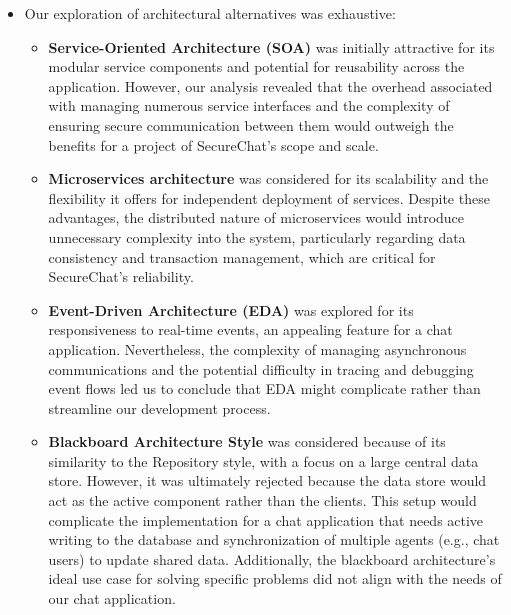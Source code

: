 \documentclass[]{article}
\begin{document}
\begin{itemize}
	\item Our exploration of architectural alternatives was exhaustive:
		\begin{itemize}
		    \item \textbf{Service-Oriented Architecture (SOA)} was initially attractive for its modular service components and potential for reusability across the application. However, our analysis revealed that the overhead associated with managing numerous service interfaces and the complexity of ensuring secure communication between them would outweigh the benefits for a project of SecureChat's scope and scale.
		    
		    \item \textbf{Microservices architecture} was considered for its scalability and the flexibility it offers for independent deployment of services. Despite these advantages, the distributed nature of microservices would introduce unnecessary complexity into the system, particularly regarding data consistency and transaction management, which are critical for SecureChat's reliability.
		    
		    \item \textbf{Event-Driven Architecture (EDA)} was explored for its responsiveness to real-time events, an appealing feature for a chat application. Nevertheless, the complexity of managing asynchronous communications and the potential difficulty in tracing and debugging event flows led us to conclude that EDA might complicate rather than streamline our development process.
		    
		    \item \textbf{Blackboard Architecture Style} was considered because of its similarity to the Repository style, with a focus on a large central data store. However, it was ultimately rejected because the data store would act as the active component rather than the clients. This setup would complicate the implementation for a chat application that needs active writing to the database and synchronization of multiple agents (e.g., chat users) to update shared data. Additionally, the blackboard architecture's ideal use case for solving specific problems did not align with the needs of our chat application.
		    

\end{itemize}
\end{itemize}
\end{document}

